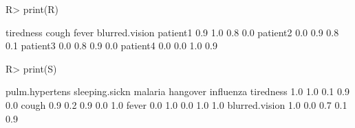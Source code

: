 \begin{Schunk}
% --begin: "comp.data"
\begin{Sinput}
R> print(R)
\end{Sinput}
\begin{Soutput}
         tiredness cough fever blurred.vision
patient1       0.9   1.0   0.8            0.0
patient2       0.0   0.9   0.8            0.1
patient3       0.0   0.8   0.9            0.0
patient4       0.0   0.0   1.0            0.9
\end{Soutput}
\begin{Sinput}
R> print(S)
\end{Sinput}
\begin{Soutput}
               pulm.hypertens sleeping.sickn malaria hangover influenza
tiredness                 1.0            1.0     0.1      0.9       0.0
cough                     0.9            0.2     0.9      0.0       1.0
fever                     0.0            1.0     0.0      1.0       1.0
blurred.vision            1.0            0.0     0.7      0.1       0.9
\end{Soutput}
%
% --end: "comp.data"
\end{Schunk}
